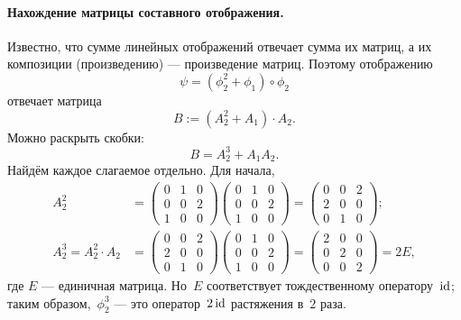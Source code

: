 \begin{solution}
	\paragraph{Нахождение матрицы составного отображения.}
	Известно, что сумме линейных отображений отвечает сумма их матриц, а их композиции (произведению) --- произведение матриц. Поэтому отображению
	\[
		\psi = (\phi_2^2 + \phi_1) \circ \phi_2
	\]
	отвечает матрица
	\[
		B := (A_2^2 + A_1) \cdot A_2
		.
	\]
	Можно раскрыть скобки:
	\[
		B = A_2^3 + A_1 A_2
		.
	\]
	Найдём каждое слагаемое отдельно. Для начала,
	\begin{align*}
		A_2^2 &=
		\left(
			\begin{array}{ccc}
				0 & 1 & 0
				\\
				\hline
				0 & 0 & 2
				\\
				\hline
				1 & 0 & 0
			\end{array}
		\right)
		\left(
		\begin{array}{c|c|c}
			0 & 1 & 0
			\\
			0 & 0 & 2
			\\
			1 & 0 & 0
		\end{array}
		\right)
		=
		\begin{pmatrix}
			0 & 0 & 2
			\\
			2 & 0 & 0
			\\
			0 & 1 & 0
		\end{pmatrix}
		;
		\\
		A_2^3 = A_2^2 \cdot A_2 &=
		\left(
			\begin{array}{ccc}
				0 & 0 & 2
				\\
				\hline
				2 & 0 & 0
				\\
				\hline
				0 & 1 & 0
			\end{array}
		\right)
		\left(
			\begin{array}{c|c|c}
				0 & 1 & 0
				\\
				0 & 0 & 2
				\\
				1 & 0 & 0
			\end{array}
		\right)
		=
		\begin{pmatrix}
			2 & 0 & 0
			\\
			0 & 2 & 0
			\\
			0 & 0 & 2
		\end{pmatrix}
		=
		2E
		,
	\end{align*}
	где $E$ --- единичная матрица. Но~$E$ соответствует тождественному оператору~$\mathop{\mathrm{id}}\nolimits$; таким образом,~$\phi_2^3$ --- это оператор~$2\mathop{\mathrm{id}}\nolimits$ растяжения в~$2$ раза.


\end{solution}
